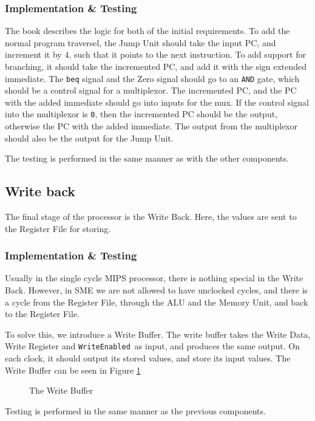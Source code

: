\subsubsection*{Implementation \& Testing}
The book describes the logic for both of the initial requirements. To add the
normal program traversel, the Jump Unit should take the input PC, and increment
it by 4, such that it points to the next instruction. To add support for
branching, it should take the incremented PC, and add it with the sign extended
immediate. The \texttt{beq} signal and the Zero signal should go to an
\texttt{AND} gate, which should be a control signal for a multiplexor. The
incremented PC, and the PC with the added immediate should go into inputs for
the mux. If the control signal into the multiplexor is \texttt{0}, then the
incremented PC should be the output, otherwise the PC with the added immediate.
The output from the multiplexor should also be the output for the Jump Unit.

The testing is performed in the same manner as with the other components.

\subsection{Write back}
The final stage of the processor is the Write Back. Here, the values are sent
to the Register File for storing.

\subsubsection*{Implementation \& Testing}
Usually in the single cycle MIPS processor, there is nothing special in the
Write Back. However, in SME we are not allowed to have unclocked cycles, and
there is a cycle from the Register File, through the ALU and the Memory Unit,
and back to the Register File.

To solve this, we introduce a Write Buffer. The write buffer takes the Write
Data, Write Register and \texttt{WriteEnabled} as input, and produces the same
output. On each clock, it should output its stored values, and store its input
values. The Write Buffer can be seen in Figure \ref{fig:wb}
\begin{figure}
    \centering
    \caption{The Write Buffer}
    \label{fig:wb}
\end{figure}

Testing is performed in the same manner as the previous components.
